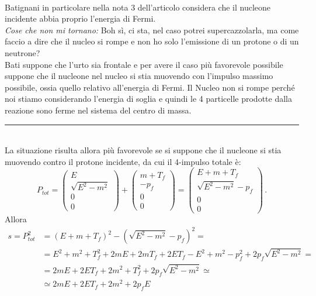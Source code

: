 \documentclass[twoside]{article}
\begin{document}
\\
Batignani in particolare nella nota 3 dell'articolo considera che il nucleone incidente abbia proprio l'energia di Fermi.
\\
\textit{Cose che non mi tornano:} Boh sì, ci sta, nel caso potrei supercazzolarla, ma come faccio a dire che il nucleo si rompe e non ho solo l'emissione di un protone o di un neutrone?
\\
Bati suppone che l'urto sia frontale e per avere il caso più favorevole possibile suppone che il nucleone nel nucleo si stia muovendo con l'impulso massimo possibile, ossia quello relativo all'energia di Fermi. Il Nucleo non si rompe perché noi stiamo considerando l'energia di soglia e quindi le 4 particelle prodotte dalla reazione sono ferme nel sistema del centro di massa.


\noindent\rule{\textwidth}{0.7pt}
\\
La situazione risulta allora più favorevole se si suppone che il nucleone si stia muovendo contro il protone incidente, da cui il 4-impulso totale è:
\begin{equation}
    P_{tot}=\left(\begin{array}{c}
          E\\
         \sqrt{E^2-m^2}\\
         0\\
         0
    \end{array}\right)
    +
    \left(\begin{array}{c}
          m+T_f\\
        - p_f\\
         0\\
         0
    \end{array}\right)
    =
    \left(\begin{array}{c}
          E+m+T_f\\
         \sqrt{E^2-m^2}-p_f\\
         0\\
         0
    \end{array}\right)\,.
\end{equation}
Allora 
\begin{align}
    s=P_{tot}^2 &=(E+m+T_f)^2-(\sqrt{E^2-m^2}-p_f)^2=\\
                &=E^2+m^2+T_f^2+2mE+2mT_f+2ET_f-E^2+m^2-p_f^2+2p_f\sqrt{E^2-m^2}=\\
                &=2mE+2ET_f+2m^2+T_f^2+2p_f\sqrt{E^2-m^2}\simeq\\
                &\simeq 2mE+2ET_f+2m^2+2p_fE
\end{align}
\end{document}
